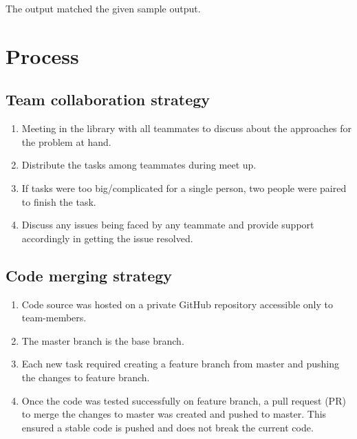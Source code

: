 
The output matched the given sample output.

\newpage

\section{Process}

\subsection{Team collaboration strategy}
\begin{enumerate}
    \item Meeting in the library with all teammates to discuss about the approaches for the problem at hand.
    \item Distribute the tasks among teammates during meet up. 
    \item If tasks were too big/complicated for a single person, two people were paired to finish the task.
    \item Discuss any issues being faced by any teammate and provide support accordingly in getting the issue resolved.
\end{enumerate}

\subsection{Code merging strategy}
\begin{enumerate}
    \item Code source was hosted on a private GitHub repository accessible only to team-members.
    \item The master branch is the base branch.
    \item Each new task required creating a feature branch from master and pushing the changes to feature branch.
    \item Once the code was tested successfully on feature branch, a pull request (PR) to merge the changes to master was created and pushed to master. This ensured a stable code is pushed and does not break the current code.
\end{enumerate}

